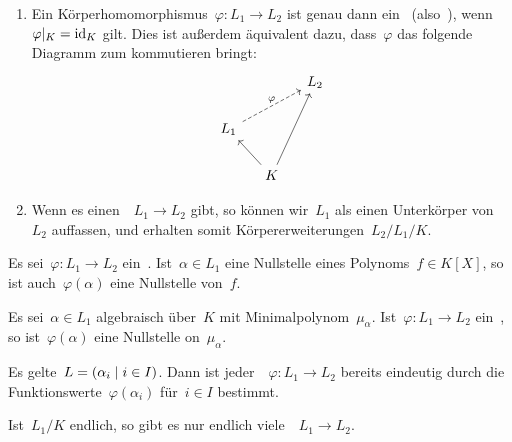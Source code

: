 \begin{remark}
  \leavevmode
  \begin{enumerate}
    \item
      Ein Körperhomomorphismus~$\varphi \colon L_1 \to L_2$ ist genau dann ein~ (also~), wenn~$\restrict{\varphi}{K} = \id_K$ gilt.
      Dies ist außerdem äquivalent dazu, dass~$\varphi$ das folgende Diagramm zum kommutieren bringt:
      \[
        \begin{tikzcd}[column sep = small]
          {}
          &
          {}
          &
          L_2
          \\
          L_1
          \arrow[dashed]{urr}[above]{\varphi}
          &
          {}
          &
          {}
          \\
          {}
          &
          K
          \arrow{ul}
          \arrow{uur}
          &
          {}
        \end{tikzcd}
      \]
    \item
      Wenn es einen~~$L_1 \to L_2$ gibt, so können wir~$L_1$ als einen Unterkörper von~$L_2$ auffassen, und erhalten somit Körpererweiterungen~$L_2/L_1/K$.
  \end{enumerate}
\end{remark}

\begin{proposition}
  Es sei~$\varphi \colon L_1 \to L_2$ ein~.
  Ist~$\alpha \in L_1$ eine Nullstelle eines Polynoms~$f \in K[X]$, so ist auch~$\varphi(\alpha)$ eine Nullstelle von~$f$.
\end{proposition}

\begin{corollary}
  \label{galois on elements}
  Es sei~$\alpha \in L_1$ algebraisch über~$K$ mit Minimalpolynom~$\mu_\alpha$.
  Ist~$\varphi \colon L_1 \to L_2$ ein~, so ist~$\varphi(\alpha)$ eine Nullstelle on~$\mu_\alpha$.
\end{corollary}

\begin{proposition}
  \label{galois uniqueness}
  Es gelte~$L = (\alpha_i \suchthat i \in I)$.
  Dann ist jeder~~$\varphi \colon L_1 \to L_2$ bereits eindeutig durch die Funktionswerte~$\varphi(\alpha_i)$ für~$i \in I$ bestimmt.
\end{proposition}

\begin{corollary}
  Ist~$L_1/K$ endlich, so gibt es nur endlich viele~~$L_1 \to L_2$.
\end{corollary}



